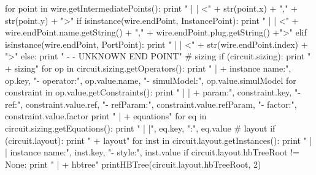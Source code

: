 \begin{DoxyCodeInclude}
{              \textcolor{keywordflow}{for} point \textcolor{keywordflow}{in} wire.getIntermediatePoints():
                  \textcolor{keywordflow}{print} \textcolor{stringliteral}{" | |        <"} + str(point.x) + \textcolor{stringliteral}{","} + str(point.y) + \textcolor{stringliteral}{">"}
              \textcolor{keywordflow}{if} isinstance(wire.endPoint, InstancePoint):
                  \textcolor{keywordflow}{print} \textcolor{stringliteral}{" | |        <"} + wire.endPoint.name.getString() + \textcolor{stringliteral}{","} + 
      wire.endPoint.plug.getString() +\textcolor{stringliteral}{">"}
              \textcolor{keywordflow}{elif} isinstance(wire.endPoint, PortPoint):
                  \textcolor{keywordflow}{print} \textcolor{stringliteral}{" | |        <"} + str(wire.endPoint.index) + \textcolor{stringliteral}{">"}
              \textcolor{keywordflow}{else}:
                  \textcolor{keywordflow}{print} \textcolor{stringliteral}{" - - UNKNOWN END POINT"}
  \textcolor{comment}{# sizing}
  \textcolor{keywordflow}{if} (circuit.sizing):
    \textcolor{keywordflow}{print} \textcolor{stringliteral}{" + sizing"}
    \textcolor{keywordflow}{for} op \textcolor{keywordflow}{in} circuit.sizing.getOperators():
      \textcolor{keywordflow}{print} \textcolor{stringliteral}{" | + instance name:"}, op.key, \textcolor{stringliteral}{"- operator:"}, op.value.name, \textcolor{stringliteral}{"- simulModel:"}, 
      op.value.simulModel
      \textcolor{keywordflow}{for} constraint \textcolor{keywordflow}{in} op.value.getConstraints():
        \textcolor{keywordflow}{print} \textcolor{stringliteral}{" | | + param:"}, constraint.key, \textcolor{stringliteral}{"- ref:"}, constraint.value.ref, \textcolor{stringliteral}{"- refParam:"}, 
      constraint.value.refParam, \textcolor{stringliteral}{"- factor:"}, constraint.value.factor
    \textcolor{keywordflow}{print} \textcolor{stringliteral}{" | + equations"}
    \textcolor{keywordflow}{for} eq \textcolor{keywordflow}{in} circuit.sizing.getEquations():
      \textcolor{keywordflow}{print} \textcolor{stringliteral}{" | |"}, eq.key, \textcolor{stringliteral}{":"}, eq.value
  \textcolor{comment}{# layout}
  \textcolor{keywordflow}{if} (circuit.layout):
    \textcolor{keywordflow}{print} \textcolor{stringliteral}{" + layout"}
    \textcolor{keywordflow}{for} inst \textcolor{keywordflow}{in} circuit.layout.getInstances():
      \textcolor{keywordflow}{print} \textcolor{stringliteral}{" | | instance name:"}, inst.key, \textcolor{stringliteral}{"- style:"}, inst.value
    \textcolor{keywordflow}{if} circuit.layout.hbTreeRoot != \textcolor{keywordtype}{None}:
      \textcolor{keywordflow}{print} \textcolor{stringliteral}{" | + hbtree"}
      printHBTree(circuit.layout.hbTreeRoot, 2)

}
\end{DoxyCodeInclude}
